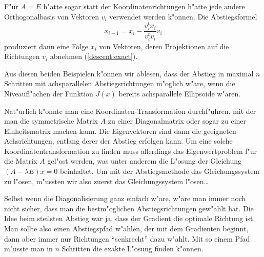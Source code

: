 F"ur $A=E$ h"atte sogar
statt der Koordinatenrichtungen h"atte jede andere Orthogonalbasis
von Vektoren $v_i$ verwendet werden k"onnen. Die Abstiegsformel
\[
x_{i+1}=x_i-\frac{v_i^tx_i}{v_i^tv_i}v_i
\]
produziert dann eine Folge $x_i$ von Vektoren, deren Projektionen auf die
Richtungen $v_i$ abnehmen (\ref{descent:exact}).

Aus diesen beiden Beispielen k"onnen wir ablesen, dass der Abstieg in
maximal $n$ Schritten mit achsparallelen Abstiegsrichtungen
m"oglich w"are, wenn die Niveaufl"achen der Funktion $J(x)$ bereits
achsparallele Ellipsoide w"aren.

Nat"urlich k"onnte man eine Koordinaten-Transformation durchf"uhren,
mit der man die symmetrische Matrix $A$ zu einer Diagonalmatrix oder
sogar zu einer Einheitsmatrix machen kann.
Die Eigenvektoren sind dann die geeigneten Achsrichtungen, entlang derer
der Abstieg erfolgen kann.
Um eine solche Koordinatentransformation zu finden muss allerdings das
Eigenwertproblem f"ur die Matrix $A$ gel"ost werden, was unter anderem
die L"osung der Gleichung $(A-\lambda E)x=0$ beinhaltet. Um mit der
Abstiegsmethode das Gleichungssystem zu l"osen, m"ussten wir also zuerst
das Gleichungssystem l"osen\dots

Selbst wenn die Diagonalisierung ganz einfach w"are, w"are man immer noch nicht
sicher, dass man die bestm"oglichen Abstiegsrichtungen gew"ahlt hat.
Die Idee beim steilsten Abstieg war ja, dass der Gradient die optimale
Richtung ist. Man sollte also einen Abstiegspfad w"ahlen, der mit
dem Gradienten beginnt, dann aber immer nur Richtungen ``senkrecht'' dazu
w"ahlt. Mit so einem Pfad m"usste man in $n$ Schritten die exakte L"osung
finden k"onnen.


